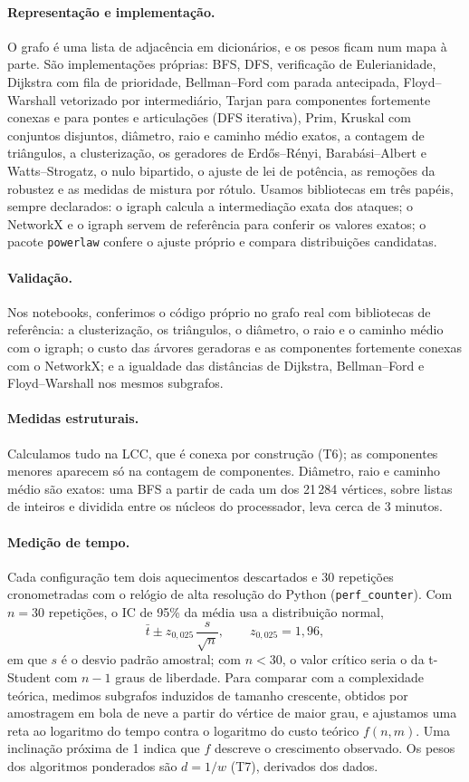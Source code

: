 \documentclass[sigconf,nonacm]{webmedia}
\begin{document}
\paragraph{Representação e implementação.}
\sloppy
O grafo é uma lista de adjacência em dicionários, e os pesos ficam
num mapa à parte. São implementações próprias: BFS, DFS, verificação
de Eulerianidade, Dijkstra com fila de prioridade, Bellman--Ford com
parada antecipada, Floyd--Warshall vetorizado por intermediário,
Tarjan para componentes fortemente conexas e para pontes e
articulações (DFS iterativa), Prim, Kruskal com conjuntos disjuntos,
diâmetro, raio e caminho médio exatos, a contagem de triângulos, a
clusterização, os geradores de Erdős--Rényi, Barabási--Albert e
Watts--Strogatz, o nulo bipartido, o ajuste de lei de potência, as
remoções da robustez e as medidas de mistura por rótulo. Usamos
bibliotecas em três papéis, sempre declarados: o igraph calcula a
intermediação exata dos ataques; o NetworkX e o igraph servem de
referência para conferir os valores exatos; o pacote
\texttt{powerlaw} confere o ajuste próprio e compara distribuições
candidatas.

\fussy
\paragraph{Validação.}
Nos notebooks, conferimos o código próprio no grafo real com
bibliotecas de referência: a clusterização, os triângulos, o diâmetro,
o raio e o caminho médio com o igraph; o custo das árvores geradoras e
as componentes fortemente conexas com o NetworkX; e a igualdade das
distâncias de Dijkstra, Bellman--Ford e Floyd--Warshall nos mesmos
subgrafos.

\paragraph{Medidas estruturais.}
Calculamos tudo na LCC, que é conexa por construção (T6); as
componentes menores aparecem só na contagem de componentes. Diâmetro,
raio e caminho médio são exatos: uma BFS a partir de cada um dos
21\,284 vértices, sobre listas de inteiros e dividida entre os núcleos
do processador, leva cerca de 3 minutos.

\paragraph{Medição de tempo.}
Cada configuração tem dois aquecimentos descartados e 30 repetições
cronometradas com o relógio de alta resolução do Python
(\texttt{perf\_counter}). Com \(n=30\) repetições, o IC de 95\% da
média usa a distribuição normal,
\[
  \bar t\pm z_{0{,}025}\,\frac{s}{\sqrt{n}},\qquad z_{0{,}025}=1{,}96,
\]
em que \(s\) é o desvio padrão amostral; com \(n<30\), o valor
crítico seria o da t-Student com \(n-1\) graus de liberdade. Para comparar com a complexidade teórica,
medimos subgrafos induzidos de tamanho crescente, obtidos por
amostragem em bola de neve a partir do vértice de maior grau, e
ajustamos uma reta ao logaritmo do tempo contra o logaritmo do custo
teórico \(f(n,m)\). Uma inclinação próxima de 1 indica que \(f\)
descreve o crescimento observado. Os pesos dos algoritmos ponderados
são \(d=1/w\) (T7), derivados dos dados.
\end{document}

